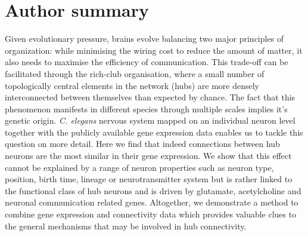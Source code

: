 \documentclass[10pt,letterpaper]{article}
\begin{document}



\section*{Author summary}
Given evolutionary pressure, brains evolve balancing two major principles of organization: while minimising the wiring cost to reduce the amount of matter, it also needs to maximise the efficiency of communication. 
This trade-off can be facilitated through the rich-club organisation, where a small number of topologically central elements in the network (hubs) are more densely interconnected between themselves than expected by chance. 
The fact that this phenomenon manifests in different species through multiple scales implies it's genetic origin.
\textit{C. elegans} nervous system mapped on an individual neuron level together with the publicly available gene expression data enables us to tackle this question on more detail.  
Here we find that indeed connections between hub neurons are the most similar in their gene expression.
We show that this effect cannot be explained by a range of neuron properties such as neuron type, position, birth time, lineage or neurotransmitter system but is rather linked to the functional class of hub neurons and is driven by glutamate, acetylcholine and neuronal communication related genes.  
Altogether, we demonstrate a method to combine gene expression and connectivity data which provides valuable clues to the general mechanisms that may be involved in hub connectivity. 
\end{document}
